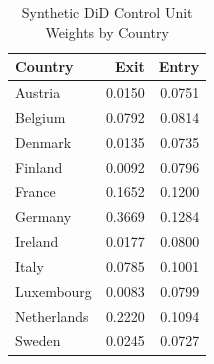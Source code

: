 \begin{table}[!h]
\centering
\caption{\label{tab:sdid_weights}Synthetic DiD Control Unit Weights by Country}
\centering
\begin{tabular}[t]{lrr}
\toprule
Country & Exit & Entry\\
\midrule
Austria & 0.0150 & 0.0751\\
Belgium & 0.0792 & 0.0814\\
Denmark & 0.0135 & 0.0735\\
Finland & 0.0092 & 0.0796\\
France & 0.1652 & 0.1200\\
\addlinespace
Germany & 0.3669 & 0.1284\\
Ireland & 0.0177 & 0.0800\\
Italy & 0.0785 & 0.1001\\
Luxembourg & 0.0083 & 0.0799\\
Netherlands & 0.2220 & 0.1094\\
\addlinespace
Sweden & 0.0245 & 0.0727\\
\bottomrule
\end{tabular}
\end{table}
